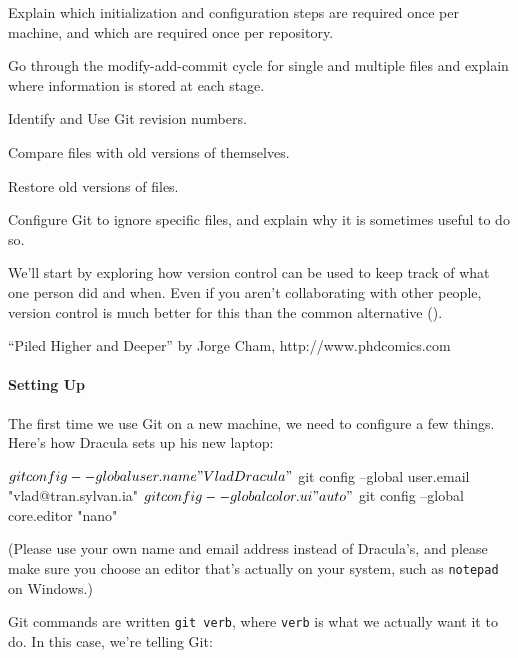 \documentclass{book}
\begin{document}
\begin{objectives}
\begin{swcitemize}
\item
  Explain which initialization and configuration steps are required once
  per machine, and which are required once per repository.
\item
  Go through the modify-add-commit cycle for single and multiple files
  and explain where information is stored at each stage.
\item
  Identify and Use Git revision numbers.
\item
  Compare files with old versions of themselves.
\item
  Restore old versions of files.
\item
  Configure Git to ignore specific files, and explain why it is
  sometimes useful to do so.
\end{swcitemize}
\end{objectives}

We'll start by exploring how version control can be used to keep track
of what one person did and when. Even if you aren't collaborating with
other people, version control is much better for this than the common
alternative ().


``Piled Higher and Deeper'' by Jorge Cham, http://www.phdcomics.com

\mbox{}\paragraph{Setting Up}

The first time we use Git on a new machine, we need to configure a few
things. Here's how Dracula sets up his new laptop:

\begin{VerbIn}
$ git config --global user.name "Vlad Dracula"
$ git config --global user.email "vlad@tran.sylvan.ia"
$ git config --global color.ui "auto"
$ git config --global core.editor "nano"
\end{VerbIn}

(Please use your own name and email address instead of Dracula's, and
please make sure you choose an editor that's actually on your system,
such as \texttt{notepad} on Windows.)

Git commands are written \texttt{git verb}, where \texttt{verb} is what
we actually want it to do. In this case, we're telling Git:
\end{document}
